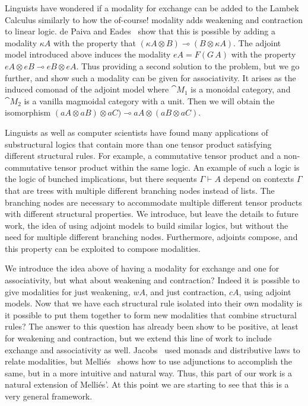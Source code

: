 Linguists have wondered if a modality for exchange can be added to the
Lambek Calculus similarly to how the of-course! modality adds
weakening and contraction to linear logic.  de Paiva and
Eades~\cite{?} show that this is possible by adding a modality $\kappa
A$ with the property that $(\kappa A \otimes B) \multimap (B \otimes
\kappa A)$.  The adjoint model introduced above induces the modality
$eA = F(G\,A)$ with the property $eA \otimes eB \multimap eB \otimes
eA$.  Thus providing a second solution to the problem, but we go
further, and show such a modality can be given for associativity. It
arises as the induced comonad of the adjoint model where $\cat{M}_1$
is a monoidal category, and $\cat{M}_2$ is a vanilla magmoidal
category with a unit.  Then we will obtain the isomorphism $(aA
\otimes aB) \otimes aC) \multimap aA \otimes (aB \otimes aC)$.

Linguists as well as computer scientists have found many applications
of substructural logics that contain more than one tensor product
satisfying different structural rules.  For example, a commutative
tensor product and a non-commutative tensor product within the same
logic.  An example of such a logic is the logic of bunched
implications, but there sequents $\Gamma \vdash A$ depend on contexts
$\Gamma$ that are trees with multiple different branching nodes
instead of lists.  The branching nodes are necessary to accommodate
multiple different tensor products with different structural
properties.  We introduce, but leave the details to future work, the
idea of using adjoint models to build similar logics, but without the
need for multiple different branching nodes.  Furthermore, adjoints
compose, and this property can be exploited to compose modalities.

We introduce the idea above of having a modality for exchange and one
for associativity, but what about weakening and contraction?  Indeed
it is possible to give modalities for just weakening, $wA$, and just
contraction, $cA$, using adjoint models.  Now that we have each
structural rule isolated into their own modality is it possible to put
them together to form new modalities that combine structural rules?
The answer to this question has already been show to be positive, at
least for weakening and contraction, but we extend this line of work
to include exchange and associativity as well.
Jacobs~\cite{JACOBS199473} used monads and distributive laws to relate
modalities, but Melli{\'e}s~\cite{Mellies:2004} shows how to use
adjunctions to accomplish the same, but in a more intuitive and
natural way.  Thus, this part of our work is a natural extension of
Melli{\'e}s'.  At this point we are starting to see that this is a
very general framework.

